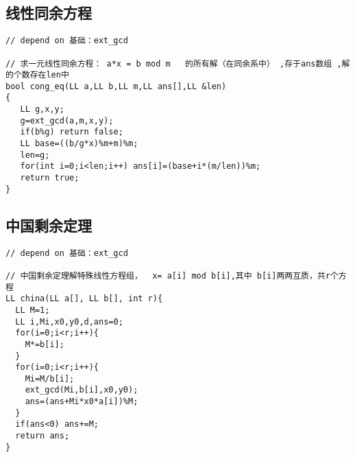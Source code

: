 \subsection{线性同余方程}
\begin{lstlisting}[language={}]
// depend on 基础：ext_gcd 

// 求一元线性同余方程： a*x = b mod m   的所有解（在同余系中） ,存于ans数组 ,解的个数存在len中 
bool cong_eq(LL a,LL b,LL m,LL ans[],LL &len)
{
   LL g,x,y;
   g=ext_gcd(a,m,x,y);
   if(b%g) return false;
   LL base=((b/g*x)%m+m)%m;
   len=g;
   for(int i=0;i<len;i++) ans[i]=(base+i*(m/len))%m;
   return true;
}
\end{lstlisting}
\subsection{中国剩余定理}
\begin{lstlisting}[language={}]
// depend on 基础：ext_gcd 

// 中国剩余定理解特殊线性方程组，  x= a[i] mod b[i],其中 b[i]两两互质，共r个方程 
LL china(LL a[], LL b[], int r){
  LL M=1;
  LL i,Mi,x0,y0,d,ans=0;
  for(i=0;i<r;i++){
    M*=b[i];  
  } 
  for(i=0;i<r;i++){
    Mi=M/b[i];
    ext_gcd(Mi,b[i],x0,y0);
    ans=(ans+Mi*x0*a[i])%M; 
  }
  if(ans<0) ans+=M;
  return ans;
}
\end{lstlisting}
